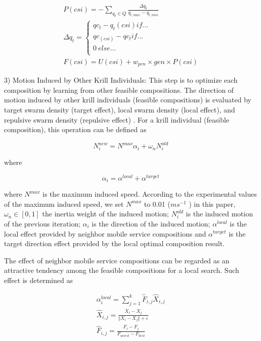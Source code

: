 \documentclass[10pt,journal,compsoc]{IEEEtran}
\begin{document}
\begin{eqnarray}
P(csi) = - \sum_{q_t \in Q} \frac{\Delta q_t}{q_{t,max} - q_{t,min}} \\
\Delta q_t = 
\left\{ 
\begin{array}{cc}
qc_t - q_t(csi)  if ... \\
qc_(csi) - qc_t  if ... \\
0 \  else ... \\
\end{array} 
\right. \\
F(csi) = U(csi) + w_{pen} \times gen \times P(csi)
\end{eqnarray}

3) Motion Induced by Other Krill Individuals: This step is to optimize each composition by learning from other feasible compositions. The direction of motion induced by other krill individuals (feasible compositions) is evaluated by  target swarm density (target effect), local swarm density (local effect), and repulsive swarm density (repulsive effect) . For a krill individual (feasible composition), this operation can be defined as

\begin{equation}
N^{new}_i = N^{max}\alpha_i + \omega_n N^{old}_i
\end{equation}

where

\begin{equation}
\alpha_i = \alpha^{local}+\alpha^{target}
\end{equation}

where $N^{max}$ is the maximum induced speed. According to the experimental values of the maximum induced speed, we set $N^{max}$ to 0.01 ($ms^{−1}$ ) in this paper, $\omega_n \in [0, 1]$ the inertia weight of the induced motion; $N^{old}_{i}$ is the induced motion of the previous iteration; $\alpha_i$ is the direction of the induced motion; $\alpha^{local}$ is the local effect provided by neighbor mobile service compositions and $\alpha^{target}$ is the target direction effect provided by the local optimal composition result.

The effect of neighbor mobile service compositions can be regarded as an attractive tendency among the feasible compositions for a local search. Such effect is determined as

\begin{eqnarray}
\alpha_i^{local} = \sum_{j=1}^{k}\hat{F}_{i,j}\hat{X}_{i,j}\\
\hat{X}_{i,j} = \frac{X_i-X_j}{\Vert X_i-X_j \Vert + \varepsilon}\\
\hat{F}_{i,j} = \frac{F_i-F_j}{F_{worst}-F_{best}}\\
\end{eqnarray}
\end{document}
